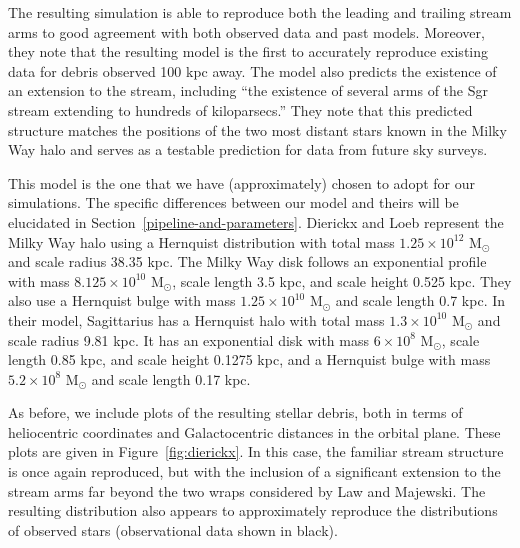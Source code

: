The resulting simulation is able to reproduce both the leading and trailing
stream arms to good agreement with both observed data and past models.
Moreover, they note that the resulting model is the first to accurately
reproduce existing data for debris observed 100 kpc away. The model also
predicts the existence of an extension to the stream, including ``the
existence of several arms of the Sgr stream extending to hundreds of
kiloparsecs.'' They note that this predicted structure matches the positions
of the two most distant stars known in the Milky Way halo and serves as a
testable prediction for data from future sky surveys.

This model is the one that we have (approximately) chosen to adopt for our
simulations. The specific differences between our model and theirs will be
elucidated in Section~\ref{pipeline-and-parameters}.  Dierickx and Loeb
represent the Milky Way halo using a Hernquist distribution with total mass
\(1.25 \times 10^{12}\) M\(_\odot\) and scale radius 38.35 kpc.  The Milky Way
disk follows an exponential profile with mass \(8.125 \times 10^{10}\)
M\(_\odot\), scale length 3.5 kpc, and scale height 0.525 kpc.  They also use
a Hernquist bulge with mass \(1.25 \times 10^{10}\) M\(_\odot\) and scale
length 0.7 kpc.  In their model, Sagittarius has a Hernquist halo with total
mass \(1.3 \times 10^{10}\) M\(_\odot\) and scale radius 9.81 kpc.  It has an
exponential disk with mass \(6 \times 10^{8}\) M\(_\odot\), scale length 0.85
kpc, and scale height 0.1275 kpc, and a Hernquist bulge with mass \(5.2 \times
10^{8}\) M\(_\odot\) and scale length 0.17 kpc.

As before, we include plots of the resulting stellar debris, both in terms of
heliocentric coordinates and Galactocentric distances in the orbital plane.
These plots are given in Figure~\ref{fig:dierickx}. In this case, the familiar
stream structure is once again reproduced, but with the inclusion of a
significant extension to the stream arms far beyond the two wraps considered
by Law and Majewski. The resulting distribution also appears to approximately
reproduce the distributions of observed stars (observational data shown in
black).

